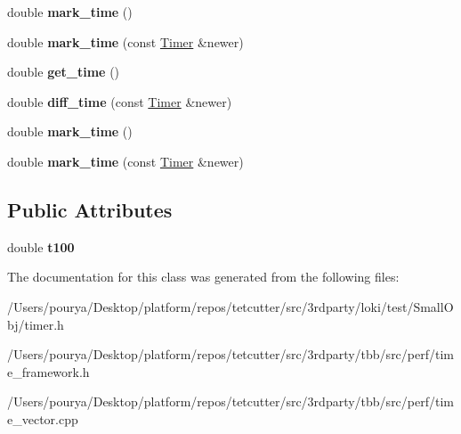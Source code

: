 \begin{DoxyCompactItemize}
\item 
\hypertarget{classTimer_a42e846438ff0a04b0906962b21855595}{}double {\bfseries mark\+\_\+time} ()\label{classTimer_a42e846438ff0a04b0906962b21855595}

\item 
\hypertarget{classTimer_af495314675addb5f2859335c0cdff234}{}double {\bfseries mark\+\_\+time} (const \hyperlink{classTimer}{Timer} \&newer)\label{classTimer_af495314675addb5f2859335c0cdff234}

\item 
\hypertarget{classTimer_a71f709ed25564085ca99a184b3b09df8}{}double {\bfseries get\+\_\+time} ()\label{classTimer_a71f709ed25564085ca99a184b3b09df8}

\item 
\hypertarget{classTimer_af9ace9b280e5c9ea0da51a02fa8fd8ab}{}double {\bfseries diff\+\_\+time} (const \hyperlink{classTimer}{Timer} \&newer)\label{classTimer_af9ace9b280e5c9ea0da51a02fa8fd8ab}

\item 
\hypertarget{classTimer_a42e846438ff0a04b0906962b21855595}{}double {\bfseries mark\+\_\+time} ()\label{classTimer_a42e846438ff0a04b0906962b21855595}

\item 
\hypertarget{classTimer_af495314675addb5f2859335c0cdff234}{}double {\bfseries mark\+\_\+time} (const \hyperlink{classTimer}{Timer} \&newer)\label{classTimer_af495314675addb5f2859335c0cdff234}

\end{DoxyCompactItemize}
\subsection*{Public Attributes}
\begin{DoxyCompactItemize}
\item 
\hypertarget{classTimer_a22fc1db87307600b1fd29ae6414ded24}{}double {\bfseries t100}\label{classTimer_a22fc1db87307600b1fd29ae6414ded24}

\end{DoxyCompactItemize}


The documentation for this class was generated from the following files\+:\begin{DoxyCompactItemize}
\item 
/\+Users/pourya/\+Desktop/platform/repos/tetcutter/src/3rdparty/loki/test/\+Small\+Obj/timer.\+h\item 
/\+Users/pourya/\+Desktop/platform/repos/tetcutter/src/3rdparty/tbb/src/perf/time\+\_\+framework.\+h\item 
/\+Users/pourya/\+Desktop/platform/repos/tetcutter/src/3rdparty/tbb/src/perf/time\+\_\+vector.\+cpp\end{DoxyCompactItemize}
